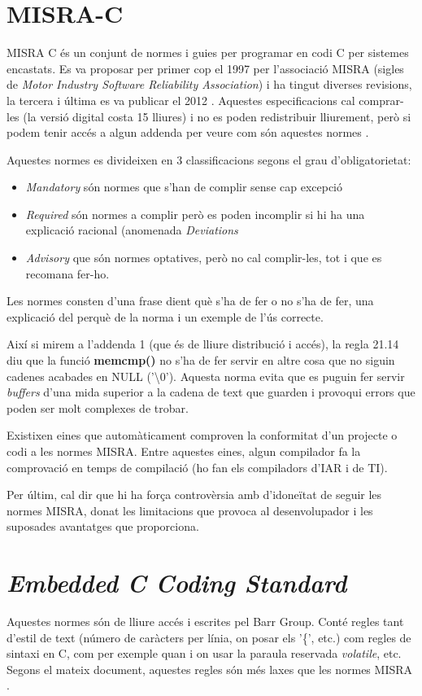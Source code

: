 \section{MISRA-C}
\label{sec:MISRA}
MISRA C és un conjunt de normes i guies per programar en codi C per sistemes encastats. Es va proposar per primer cop el 1997 per l'associació MISRA (sigles de {\em Motor Industry Software Reliability Association}) i ha tingut diverses revisions, la tercera i última es va publicar el 2012 \cite{MISRAHomepage}\cite{MISRAC2012}.
Aquestes especificacions cal comprar-les (la versió digital costa 15 lliures) i no es poden redistribuir lliurement, però si podem tenir accés a algun addenda per veure com són aquestes normes \cite{MISRAAmend}.

Aquestes normes es divideixen en 3 classificacions segons el grau d'obligatorietat:
\begin{itemize}
 \item {\em Mandatory} són normes que s'han de complir sense cap excepció
 \item {\em Required} són normes a complir però es poden incomplir si hi ha una explicació racional (anomenada {\em Deviations}
 \item {\em Advisory} que són normes optatives, però no cal complir-les, tot i que es recomana fer-ho.
\end{itemize}

Les normes consten d'una frase dient què s'ha de fer o no s'ha de fer, una explicació del perquè de la norma i un exemple de l'ús correcte.

Així si mirem a l'addenda 1 \cite[4]{MISRAAmend} (que és de lliure distribució i accés), la regla 21.14 diu que la funció {\bf memcmp()} no s'ha de fer servir en altre cosa que no siguin cadenes acabades en NULL ('\textbackslash 0'). Aquesta norma evita que es puguin fer servir {\em buffers} d'una mida superior a la cadena de text que guarden i provoqui errors que poden ser molt complexes de trobar.

Existixen eines que automàticament comproven la conformitat d'un projecte o codi a les normes MISRA. Entre aquestes eines, algun compilador fa la comprovació en temps de compilació (ho fan els compiladors d'IAR i de TI).

Per últim, cal dir que hi ha força controvèrsia amb d'idoneïtat de seguir les normes MISRA, donat les limitacions que provoca al desenvolupador i les suposades avantatges que proporciona.

\section{\em Embedded C Coding Standard}
Aquestes normes són de lliure accés i escrites pel Barr Group. Conté regles tant d'estil de text (número de caràcters per línia, on posar els '\{', etc.) com regles de sintaxi en C, com per exemple quan i on usar la paraula reservada {\em volatile}, etc. Segons el mateix document, aquestes regles són més laxes que les normes MISRA \cite{BARRGuidelines}.

